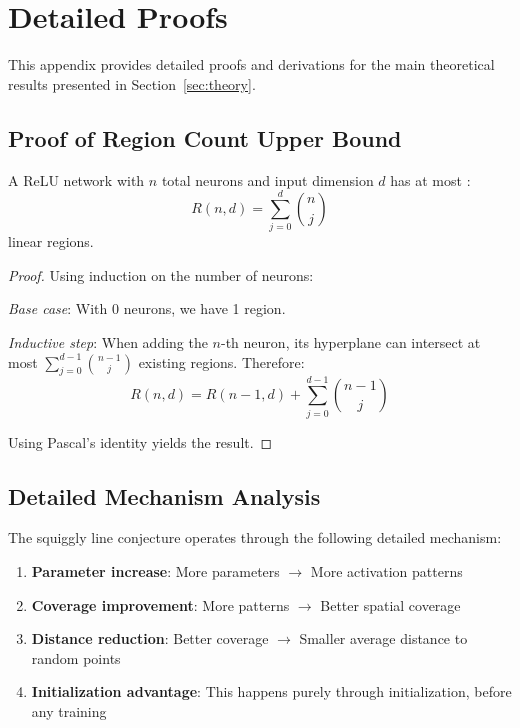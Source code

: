\section{Detailed Proofs}
\label{sec:detailed-proofs}

This appendix provides detailed proofs and derivations for the main theoretical results presented in Section~\ref{sec:theory}.

\subsection{Proof of Region Count Upper Bound}
\label{subsec:region-count-proof}

\begin{theorem}
A ReLU network with $n$ total neurons and input dimension $d$ has at most \cite{Montfar2014OnTN}:
$$R(n,d) = \sum_{j=0}^d \binom{n}{j}$$
linear regions.
\end{theorem}

\begin{proof}
Using induction on the number of neurons:

\textit{Base case}: With 0 neurons, we have 1 region.

\textit{Inductive step}: When adding the $n$-th neuron, its hyperplane can intersect at most $\sum_{j=0}^{d-1} \binom{n-1}{j}$ existing regions. Therefore:
$$R(n,d) = R(n-1,d) + \sum_{j=0}^{d-1} \binom{n-1}{j}$$

Using Pascal's identity yields the result.
\end{proof}

\subsection{Detailed Mechanism Analysis}
\label{subsec:mechanism-analysis}

The squiggly line conjecture operates through the following detailed mechanism:

\begin{enumerate}
    \item \textbf{Parameter increase}: More parameters $\rightarrow$ More activation patterns
    \item \textbf{Coverage improvement}: More patterns $\rightarrow$ Better spatial coverage  
    \item \textbf{Distance reduction}: Better coverage $\rightarrow$ Smaller average distance to random points
    \item \textbf{Initialization advantage}: This happens purely through initialization, before any training
\end{enumerate}

